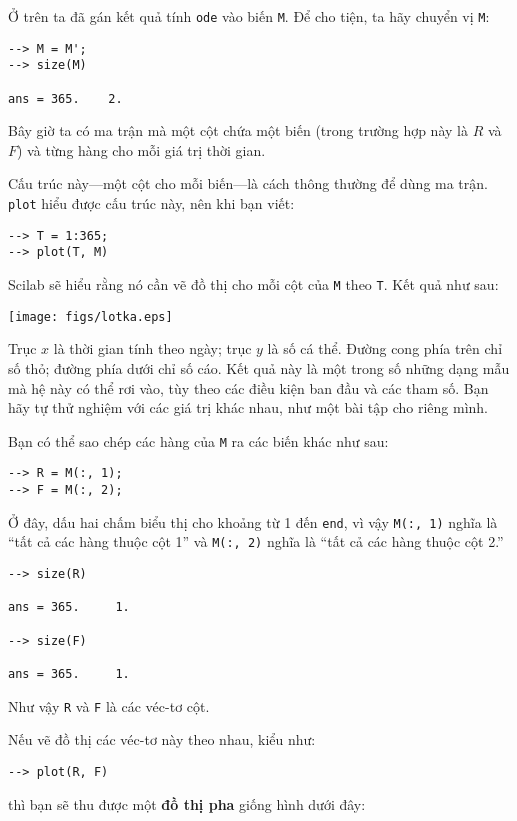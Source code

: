\documentclass[12pt]{book}
\begin{document}
Ở trên ta đã gán kết quả tính {\tt ode} vào biến \texttt{M}. Để cho tiện,
ta hãy chuyển vị \texttt{M}:


\begin{verbatim}
--> M = M';
--> size(M)

ans = 365.    2.
\end{verbatim}
%
Bây giờ ta có ma trận mà một cột
chứa một biến (trong trường hợp này là $R$ và $F$) và từng hàng
cho mỗi giá trị thời gian.

Cấu trúc này---một cột cho mỗi biến---là cách thông thường để
dùng ma trận. {\tt plot} hiểu được cấu trúc này, nên khi bạn viết:

\begin{verbatim}
--> T = 1:365;
--> plot(T, M)
\end{verbatim}
%
Scilab sẽ hiểu rằng nó cần vẽ đồ thị cho mỗi cột của {\tt M}
theo {\tt T}. Kết quả như sau: 

\centerline{\texttt{[image: figs/lotka.eps]}}

Trục $x$ là thời gian tính theo ngày; trục $y$ là số cá thể. 
Đường cong phía trên chỉ số thỏ; đường phía dưới chỉ số cáo.
Kết quả này là một trong số những dạng mẫu mà hệ này
có thể rơi vào, tùy theo các điều kiện ban đầu và các tham số.
Bạn hãy tự thử nghiệm với các giá trị khác nhau, như một
bài tập cho riêng mình.

Bạn có thể sao chép các hàng của {\tt M} ra các biến khác như sau:

\begin{verbatim}
--> R = M(:, 1);
--> F = M(:, 2);
\end{verbatim}
%
Ở đây, dấu hai chấm biểu thị cho khoảng từ 1 đến {\tt end},
vì vậy {\tt M(:, 1)} nghĩa là ``tất cả các hàng thuộc cột 1'' và
{\tt M(:, 2)} nghĩa là ``tất cả các hàng thuộc cột 2.''

\begin{verbatim}
--> size(R)

ans = 365.     1.

--> size(F)

ans = 365.     1.
\end{verbatim}
%
Như vậy {\tt R} và {\tt F} là các véc-tơ cột.

Nếu vẽ đồ thị các véc-tơ này theo nhau, kiểu như:

\begin{verbatim}
--> plot(R, F)
\end{verbatim}
%
thì bạn sẽ thu được một {\bf đồ thị pha} giống hình dưới đây:
\end{document}
